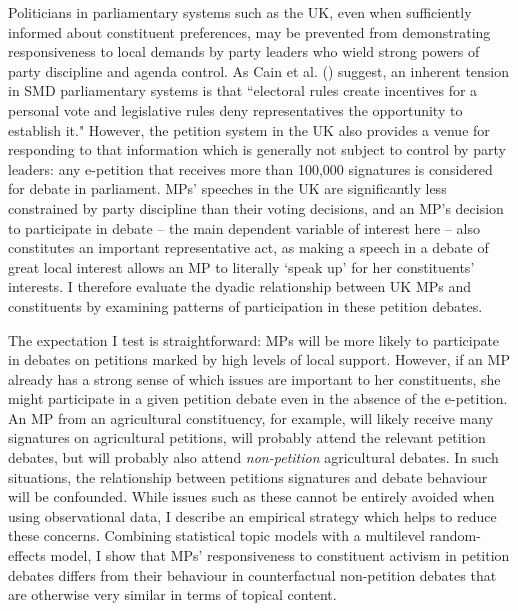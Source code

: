 \documentclass[12pt]{article}
\begin{document}
Politicians in parliamentary systems such as the UK, even when sufficiently informed about constituent preferences, may be prevented from demonstrating responsiveness to local demands by party leaders who wield strong powers of party discipline and agenda control. As Cain et al. (\citeyear[217]{cain1987personal}) suggest, an inherent tension in SMD parliamentary systems is that ``electoral rules create incentives for a personal vote and legislative rules deny representatives the opportunity to establish it." However, the petition system in the UK also provides a venue for responding to that information which is generally not subject to control by party leaders: any e-petition that receives more than 100,000 signatures is considered for debate in parliament. MPs' speeches in the UK are significantly less constrained by party discipline than their voting decisions, and an MP's decision to participate in debate -- the main dependent variable of interest here -- also constitutes an important representative act, as making a speech in a debate of great local interest allows an MP to literally `speak up' for her constituents' interests. I therefore evaluate the dyadic relationship between UK MPs and constituents by examining patterns of participation in these petition debates.

The expectation I test is straightforward: MPs will be more likely to participate in debates on petitions marked by high levels of local support. However, if an MP already has a strong sense of which issues are important to her constituents, she might participate in a given petition debate even in the absence of the e-petition. An MP from an agricultural constituency, for example, will likely receive many signatures on agricultural petitions, will probably attend the relevant petition debates, but will probably also attend \emph{non-petition} agricultural debates. In such situations, the relationship between petitions signatures and debate behaviour will be confounded. While issues such as these cannot be entirely avoided when using observational data, I describe an empirical strategy which helps to reduce these concerns. Combining statistical topic models with a multilevel random-effects model, I show that MPs' responsiveness to constituent activism in petition debates differs from their behaviour in counterfactual non-petition debates that are otherwise very similar in terms of topical content. 
\end{document}
